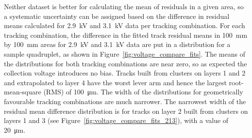 Neither dataset is better for calculating the mean of residuals in a given area, so a systematic uncertainty can be assigned based on the difference in residual means calculated for 2.9~kV and 3.1~kV data per tracking combination. For each tracking combination, the difference in the fitted track residual means in \SI{100}{mm} by \SI{100}{mm} areas for 2.9~kV and 3.1~kV data are put in a distribution for a sample quadruplet, as shown in Figure~\ref{fig:voltage_compare_fits}. The means of the distributions for both tracking combinations are near zero, so as expected the collection voltage introduces no bias. Tracks built from clusters on layers 1 and 2 and extrapolated to layer 4 have the worst lever arm and hence the largest root-mean-square (RMS) of \SI{100}{\micro\meter}. The width of the distributions for geometrically favourable tracking combinations are much narrower. The narrowest width of the residual mean difference distribution is for tracks on layer 2 built from clusters on layers 1 and 3 (see Figure~\ref{fig:voltage_compare_fits_213}), with a value of \SI{20}{\micro\meter}.

